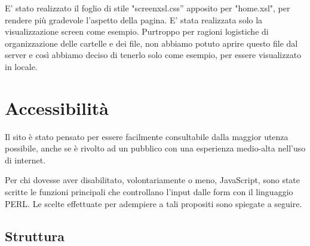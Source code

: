 \documentclass[12pt]{article}
\begin{document}
E’ stato realizzato il foglio di stile "screen\textunderscore xsl.css” apposito per "home.xsl", per rendere più gradevole l’aspetto della pagina. E’ stata realizzata solo la visualizzazione screen come esempio. 
Purtroppo per ragioni logistiche di organizzazione delle cartelle e dei file, non abbiamo potuto aprire questo file dal server e così abbiamo deciso di tenerlo solo come esempio, per essere visualizzato in locale.


\section{Accessibilità}
Il sito è stato pensato per essere facilmente consultabile dalla maggior utenza possibile, anche se è rivolto ad un pubblico con una esperienza medio-alta nell’uso di internet.

Per chi dovesse aver disabilitato, volontariamente o meno, JavaScript, sono state scritte le funzioni principali che controllano l’input dalle form con il linguaggio PERL. Le scelte effettuate per adempiere a tali propositi sono spiegate a seguire.

	\subsection{Struttura}
	
\end{document}
